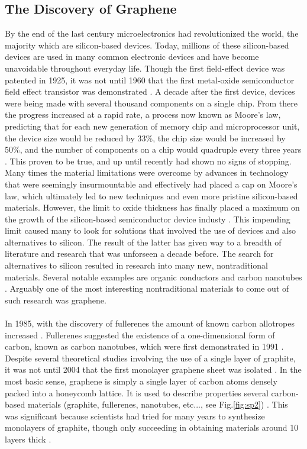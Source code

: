 \documentclass[%
 reprint,
 amsmath,amssymb,
 aps,
pra,
]{revtex4-1}
\begin{document}
\subsection{\label{subsec:discovery} The Discovery of Graphene}
By the end of the last century microelectronics had revolutionized the world, the majority which are silicon-based devices. Today, millions of these silicon-based devices are used in many common electronic devices and have become unavoidable throughout everyday life. Though the first field-effect device was patented in 1925, it was not until 1960 that the first metal-oxide semiconductor field effect transistor was demonstrated \cite{Lilienfeld1925, Atalla1960, Schulz1999}. A decade after the first device, devices were being made with several thousand components on a single chip. From there the progress increased at a rapid rate, a process now known as Moore's law, predicting that for each new generation of memory chip and microprocessor unit, the device size would be reduced by 33\%, the chip size would be increased by 50\%, and the number of components on a chip would quadruple every three years \cite{Schulz1999, Moore1965}. This proven to be true, and up until recently had shown no signs of stopping. Many times the material limitations were overcome by advances in technology that were seemingly insurmountable and effectively had placed a cap on Moore's law, which ultimately led to new techniques and even more pristine silicon-based materials. However, the limit to oxide thickness has finally placed a maximum on the growth of the silicon-based semiconductor device industy \cite{Schulz1999}. This impending limit caused many to look for solutions that involved the use of  devices and also alternatives to silicon. The result of the latter has given way to a breadth of literature and research that was unforseen a decade before. The search for alternatives to silicon resulted in research into many new, nontraditional materials. Several notable examples are organic conductors and carbon nanotubes \cite{Mascaro2001, Baughman2002}. Arguably one of the most interesting nontraditional materials to come out of such research was graphene.  
\\ \\

In 1985, with the discovery of fullerenes the amount of known carbon allotropes increased \cite{krotoFullerenes1985, nanoscaleReview2011}. Fullerenes suggested the existence of a one-dimensional form of carbon, known as carbon nanotubes, which were first demonstrated in 1991 \cite{iijimaCarbonNanotubes1991}. Despite several theoretical studies involving the use of a single layer of graphite, it was not until 2004 that the first monolayer graphene sheet was isolated \cite{novoselovEtAl2004, novoselovEtAl2005}. In the most basic sense, graphene is simply a single layer of carbon atoms densely packed into a honeycomb lattice. It is used to describe properties several carbon-based materials (graphite, fullerenes, nanotubes, etc..., see Fig.\ref{fig:sp2}) \cite{Dresselhaus2002, Brenner2002, novoselovEtAl2004}. This was significant because scientists had tried for many years to synthesize monolayers of graphite, though only succeeding in obtaining materials around 10 layers thick \cite{nanoscaleReview2011}.
\end{document}
